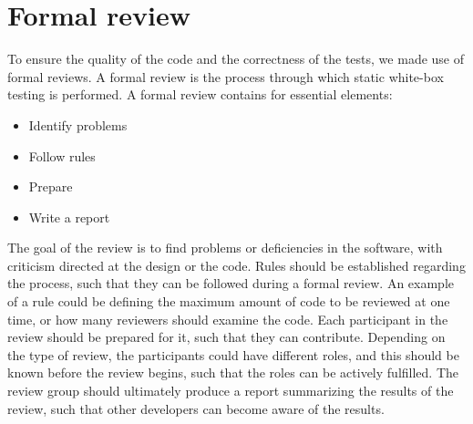 \section{Formal review}
To ensure the quality of the code and the correctness of the tests, we made use of formal reviews.
A formal review is the process through which static white-box testing is performed.
A formal review contains for essential elements\cite{SoftwareTesting}:
\begin{itemize}\label{formalreview}
    \item Identify problems
    \item Follow rules
    \item Prepare
    \item Write a report
\end{itemize}
The goal of the review is to find problems or deficiencies in the software, with criticism directed at the design or the code.
Rules should be established regarding the process, such that they can be followed during a formal review.
An example of a rule could be defining the maximum amount of code to be reviewed at one time, or how many reviewers should examine the code.
Each participant in the review should be prepared for it, such that they can contribute.
Depending on the type of review, the participants could have different roles, and this should be known before the review begins, such that the roles can be actively fulfilled.
The review group should ultimately produce a report summarizing the results of the review, such that other developers can become aware of the results. 

